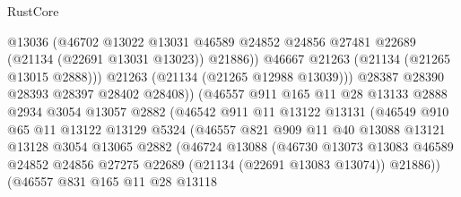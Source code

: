 \begin{lexlean}{RustCore}
\begin{coremodule}
                              @13036
                              (@46702
                                @13022
                                @13031
                                @46589
                                @24852
                                @24856
                                @27481
                                @22689
                                (@21134 (@22691 @13031 @13023))
                                @21886))
                            @46667
                            @21263
                            (@21134 (@21265 @13015 @2888)))
                          @21263
                          (@21134 (@21265 @12988 @13039)))
                        @28387
                        @28390
                        @28393
                        @28397
                        @28402
                        @28408))
                    (@46557
                      @911
                      @165
                      @11
                      @28
                      @13133
                      @2888
                      @2934
                      @3054
                      @13057
                      @2882
                      (@46542
                        @911
                        @11
                        @13122
                        @13131
                        (@46549
                          @910
                          @65
                          @11
                          @13122
                          @13129
                          @5324
                          (@46557
                            @821
                            @909
                            @11
                            @40
                            @13088
                            @13121
                            @13128
                            @3054
                            @13065
                            @2882
                            (@46724
                              @13088
                              (@46730
                                @13073
                                @13083
                                @46589
                                @24852
                                @24856
                                @27275
                                @22689
                                (@21134 (@22691 @13083 @13074))
                                @21886))
                            (@46557
                              @831
                              @165
                              @11
                              @28
                              @13118

\end{coremodule}
\end{lexlean}

